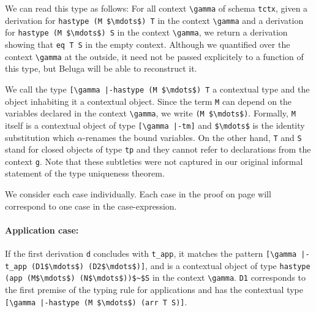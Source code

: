 We can read this type as follows: For all context \lstinline!\gamma! of
schema \lstinline!tctx!, given a derivation for 
\lstinline!hastype (M $\mdots$) T! in the context \lstinline!\gamma! and a derivation for 
\lstinline!hastype (M $\mdots$) S! in the context \lstinline!\gamma!, we return a
derivation showing that \lstinline!eq T S! in the empty context.
Although we quantified over the context \lstinline!\gamma! at the outside,
it need not be passed explicitely to a function of this type, but
Beluga will be able to reconstruct it. 

We call the type \lstinline![\gamma |-hastype (M $\mdots$) T! a contextual type and
the object inhabiting it a contextual object. 
Since the term \lstinline!M! can depend on the variables declared in the
context \lstinline!\gamma!, we  write  \lstinline!(M $\mdots$)!. Formally,
\lstinline!M! itself is a contextual object of type 
\lstinline![\gamma |-tm]! and \lstinline!$\mdots$! is the identity substitution
which $\alpha$-renames the bound variables. 
On the other hand, \lstinline!T! and \lstinline!S! stand for closed
objects of type \lstinline!tp! and they cannot refer to declarations
from the context \lstinline!g!. Note that these subtleties were not
captured in our original informal statement of the type uniqueness
theorem. 

We consider each case individually. Each case in the proof on page
\pageref{sec:thmunique} will correspond to one case in the
case-expression.
%
\paragraph{Application case:} If the first derivation \lstinline{d} concludes
with \lstinline{t_app}, it matches 
the pattern \lstinline![\gamma |-t_app (D1$\mdots$) (D2$\mdots$)]!, and is
a contextual object of type 
\lstinline!hastype (app (M$\mdots$) (N$\mdots$))$~$S! in the context \lstinline!\gamma!.  %
\lstinline!D1! corresponds to the first
premise of the typing rule for applications and has the contextual type 
\lstinline![\gamma |-hastype (M $\mdots$) (arr T S)]!.

